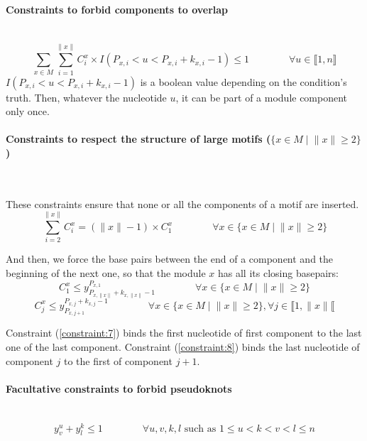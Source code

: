 \documentclass{article}
\begin{document}
\paragraph{Constraints to forbid components to overlap} ~
\begin{equation} \label{constraint:5}
	\sum_{x \in M} \sum_{i=1}^{\|x\|} C^x_i \times I(P_{x,i}<u<P_{x,i}+k_{x,i}-1) \leq 1 \qquad \qquad \forall u \in \llbracket 1,n \rrbracket
\end{equation}
$I(P_{x,i}<u<P_{x,i}+k_{x,i}-1)$ is a boolean value depending on the condition's truth. Then, whatever the nucleotide $u$, it can be part of a module component only once.

\paragraph{Constraints to respect the structure of large motifs ($\{ x\in M \; | \; \|x\| \geq 2\}$)} ~ 

These constraints ensure that none or all the components of a motif are inserted.
\begin{equation}\label{constraint:6}
	\sum_{i=2}^{\|x\|} C^x_i = (\|x\| - 1) \times C^{x}_{1}	 \qquad \qquad \forall x \in \{ x\in M \; | \; \|x\| \geq 2\}
\end{equation}

And then, we force the base pairs between the end of a component and the beginning of the next one, so that the module $x$ has all its closing basepairs:
\begin{equation}\label{constraint:7}
	C^x_1 \leq y^{P_{x,1}}_{P_{x,\|x\|}+k_{x,\|x\|}-1} \qquad \qquad \forall x \in \{ x\in M \; | \; \|x\| \geq 2\}
\end{equation}
\begin{equation}\label{constraint:8}
	C^x_j \leq y^{P_{x,j}+k_{x,j}-1}_{P_{x,j+1}} \qquad \qquad \forall x \in \{ x\in M \; | \; \|x\| \geq 2\}, \forall j \in \llbracket 1,\|x\| \llbracket
\end{equation}

Constraint (\ref{constraint:7}) binds the first nucleotide of first component to the last one of the last component. 
Constraint (\ref{constraint:8}) binds the last nucleotide of component $j$ to the first of component $j+1$.

\paragraph{Facultative constraints to forbid pseudoknots} ~
\begin{equation}\label{constraint:9}
	y^u_v + y^k_l \leq 1 \qquad \qquad \forall u,v,k,l \text{ such as } 1\leq u<k<v<l\leq n
\end{equation}
\end{document}
